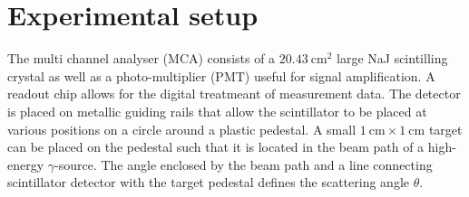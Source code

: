 
\section{Experimental setup}
\label{sec:setup}

The multi channel analyser (MCA) consists of a $\SI{20.43}{\centi\meter\squared}$
large NaJ scintilling crystal as well as a photo-multiplier (PMT) useful for
signal amplification. A readout chip allows for the digital treatmeant of measurement
data. The detector is placed on metallic guiding rails that allow the scintillator
to be placed at various positions on a circle around a plastic pedestal. A small
$\SI{1}{\centi\meter}\times\SI{1}{\centi\meter}$ target can be placed on the
pedestal such that it is located in the beam path of a high-energy $\gamma$-source.
The angle enclosed by the beam path and a line connecting scintillator detector with
the target pedestal defines the scattering angle $\theta$.
